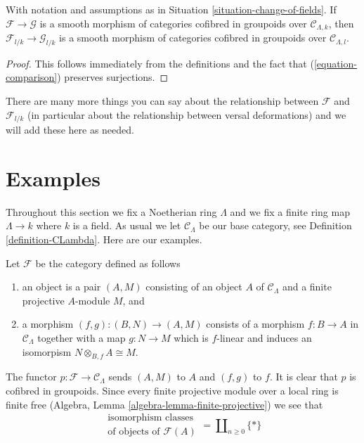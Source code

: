 \begin{lemma}
\label{lemma-change-of-fields-smooth}
With notation and assumptions as in Situation \ref{situation-change-of-fields}.
If $\mathcal{F} \to \mathcal{G}$ is a smooth morphism of categories cofibred
in groupoids over $\mathcal{C}_{\Lambda, k}$, then
$\mathcal{F}_{l/k} \to \mathcal{G}_{l/k}$ is a smooth morphism of categories
cofibred in groupoids over $\mathcal{C}_{\Lambda, l}$.
\end{lemma}

\begin{proof}
This follows immediately from the definitions and the fact that
(\ref{equation-comparison}) preserves surjections.
\end{proof}

\noindent
There are many more things you can say about the relationship between
$\mathcal{F}$ and $\mathcal{F}_{l/k}$ (in particular about the relationship
between versal deformations) and we will add these here as needed.






\section{Examples}
\label{section-examples}

\noindent
Throughout this section we fix a Noetherian ring $\Lambda$ and
we fix a finite ring map $\Lambda \to k$ where $k$ is a field.
As usual we let $\mathcal{C}_\Lambda$ be our base category, see
Definition \ref{definition-CLambda}. Here are our examples.

\begin{example}
\label{example-finite-projective-modules}
Let $\mathcal{F}$ be the category defined as follows
\begin{enumerate}
\item an object is a pair $(A, M)$ consisting of an
object $A$ of $\mathcal{C}_\Lambda$ and a
finite projective $A$-module $M$, and
\item a morphism $(f, g) : (B, N) \to (A, M)$ consists of
a morphism $f : B \to A$ in $\mathcal{C}_\Lambda$ together
with a map $g : N \to M$ which is $f$-linear and induces
an isomorpism $N \otimes_{B, f} A \cong M$.
\end{enumerate}
The functor $p : \mathcal{F} \to \mathcal{C}_\Lambda$ sends $(A, M)$ to $A$
and $(f, g)$ to $f$. It is clear that $p$ is cofibred in groupoids.
Since every finite projective module over a local ring is finite free
(Algebra, Lemma \ref{algebra-lemma-finite-projective})
we see that
$$
\begin{matrix}
\text{isomorphism classes} \\
\text{of objects of }\mathcal{F}(A)
\end{matrix}
= \coprod\nolimits_{n \geq 0} \{*\}
$$
\end{example}

